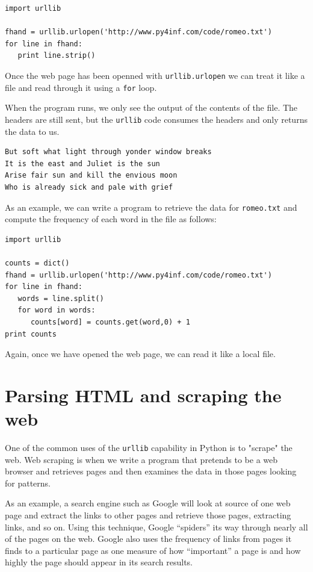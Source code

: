 \beforeverb
\begin{verbatim}
import urllib

fhand = urllib.urlopen('http://www.py4inf.com/code/romeo.txt')
for line in fhand:
   print line.strip()
\end{verbatim}
\afterverb
%
Once the web page has been openned with 
{\tt urllib.urlopen} we can treat it like 
a file and read through it using a 
{\tt for} loop.   

When the program runs, we only see the output
of the contents of the file.   The headers
are still sent, but the {\tt urllib} code
consumes the headers and only returns the 
data to us.

\beforeverb
\begin{verbatim}
But soft what light through yonder window breaks
It is the east and Juliet is the sun
Arise fair sun and kill the envious moon
Who is already sick and pale with grief
\end{verbatim}
\afterverb
%

As an example, we can write 
a program to retrieve the data for
{\tt romeo.txt} and compute the frequency
of each word in the file as follows:

\beforeverb
\begin{verbatim}
import urllib

counts = dict()
fhand = urllib.urlopen('http://www.py4inf.com/code/romeo.txt')
for line in fhand:
   words = line.split()
   for word in words:
      counts[word] = counts.get(word,0) + 1   
print counts
\end{verbatim}
\afterverb
%
Again, once we have opened the web page, 
we can read it like a local file.

\section{Parsing HTML and scraping the web}

One of the common uses of the {\tt urllib} capability in Python is 
to "scrape" the web.   Web scraping is when we write a program
that pretends to be a web browser and retrieves pages and then 
examines the data in those pages looking for patterns.

As an example, a search engine such as Google will look at source 
of one web page and extract the links to other pages and retrieve
those pages, extracting links, and so on.   Using this technique,
Google ``spiders'' its way through nearly all of the pages on 
the web.   
Google also uses the frequency of links from pages it finds 
to a particular page as one measure of how ``important'' 
a page is and how highly the page should appear in its search results.

